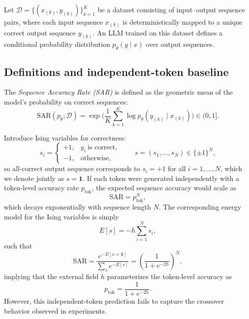 \documentclass{article}
\theoremstyle{plain}
\begin{document}
Let \(\mathcal{D} = \{(x_{(k)}, y_{(k)})\}_{k=1}^{K}\) be a dataset consisting of input–output sequence pairs,
where each input sequence \(x_{(k)}\) is deterministically mapped to a unique correct output sequence \(y_{(k)}\).
An LLM trained on this dataset defines a conditional probability distribution
\(p_{\theta}(y \mid x)\) over output sequences.

\subsection{Definitions and independent-token baseline}\label{app:def}
The \emph{Sequence Accuracy Rate (SAR)} is defined as the geometric mean of the model's probability on correct sequences:
\begin{equation}
\mathrm{SAR}(p_\theta;\mathcal{D})
=\exp\!\Big(\frac{1}{K}\sum_{k=1}^{K}\log p_\theta(y_{(k)}\mid x_{(k)})\Big)\in(0,1].
\end{equation}

Introduce Ising variables for correctness:
\[
s_i=\begin{cases}
+1,& y_i\ \text{is correct},\\
-1,& \text{otherwise},
\end{cases}
\qquad s=(s_1,\dots,s_N)\in\{\pm1\}^N,
\]
so all-correct output sequence corresponds to \(s_i = +1\) for all \(i = 1, \ldots, N\),
which we denote jointly as \(s = \mathbf{1}\).
If each token were generated independently with a token-level accuracy rate \(p_{\mathrm{tok}}\),
the expected sequence accuracy would scale as
\begin{equation}
\mathrm{SAR} = p_{\mathrm{tok}}^{N},
\end{equation}
which decays exponentially with sequence length \(N\).
The corresponding energy model for the Ising variables is simply
\begin{equation}
E[s] = -h \sum_{i=1}^{N} s_i,
\end{equation}
such that
\begin{equation}
\mathrm{SAR}
= \frac{e^{-E[s=\mathbf{1}]}}{\sum_{s} e^{-E[s]}}
= \left(\frac{1}{1 + e^{-2h}}\right)^{N},
\end{equation}
implying that the external field \(h\) parameterizes the token-level accuracy as
\begin{equation}
p_{\mathrm{tok}} = \frac{1}{1 + e^{-2h}}.
\end{equation}
However, this independent-token prediction fails to capture
the crossover behavior observed in experiments.
\end{document}
